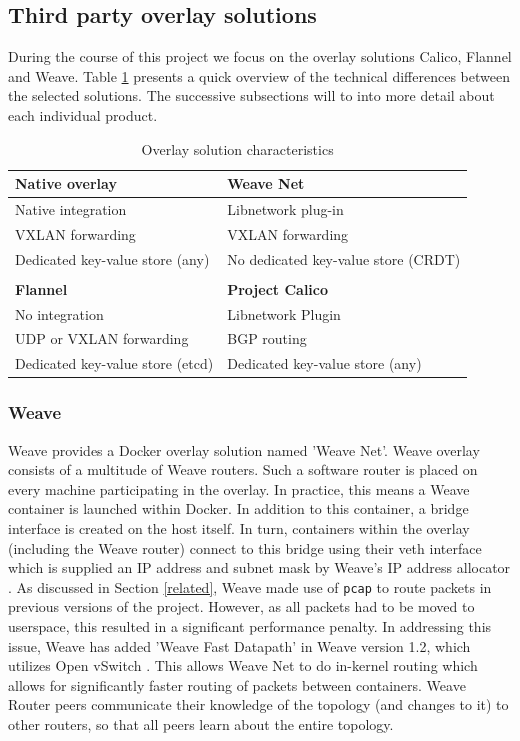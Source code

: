 \subsection{Third party overlay solutions}
During the course of this project we focus on the overlay solutions Calico, Flannel and Weave. Table \ref{overlayschar} presents a quick overview of the technical differences between the selected solutions. The successive subsections will to into more detail about each individual product.   

\begin{table}[H]
\centering
\begin{tabular}{@{}ll@{}}
\toprule
\textbf{Native overlay} & \textbf{Weave Net} \\ \midrule
Native integration & Libnetwork plug-in \\
VXLAN forwarding & VXLAN forwarding \\
Dedicated key-value store (any) & No dedicated key-value store (CRDT) \\
 &  \\ \midrule
\textbf{Flannel} & \textbf{Project Calico} \\ \midrule
No integration & Libnetwork Plugin \\
UDP or VXLAN forwarding & BGP routing \\
Dedicated key-value store (etcd) & Dedicated key-value store (any) \\ \bottomrule
\end{tabular}
\caption{Overlay solution characteristics}
\label{overlayschar}
\end{table}


\subsubsection{Weave}
Weave provides a Docker overlay solution named 'Weave Net'. Weave overlay consists of a multitude of Weave routers. Such a software router is placed on every machine participating in the overlay. In practice, this means a Weave container is launched within Docker. In addition to this container, a bridge interface is created on the host itself. In turn, containers within the overlay (including the Weave router) connect to this bridge using their veth interface which is supplied an IP address and subnet mask by Weave’s IP address allocator \cite{Weave2015}. As discussed in Section \ref{related}, Weave made use of \texttt{pcap} to route packets in previous versions of the project. However, as all packets had to be moved to userspace, this resulted in a significant performance penalty. In addressing this issue, Weave has added 'Weave Fast Datapath' in Weave version 1.2, which utilizes Open vSwitch \cite{davidwragg2015}. This allows Weave Net to do in-kernel routing which allows for significantly faster routing of packets between containers. Weave Router peers communicate their knowledge of the topology (and changes to it) to other routers, so that all peers learn about the entire topology. 

